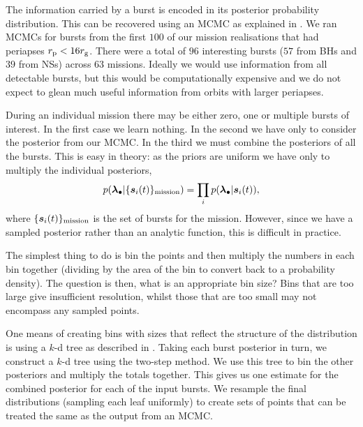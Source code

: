 The information carried by a burst is encoded in its posterior probability distribution. This can be recovered using an MCMC as explained in . We ran MCMCs for bursts from the first $100$ of our mission realisations that had periapses $r_\mathrm{p} < 16 r_\mathrm{g}$. There were a total of $96$ interesting bursts ($57$ from BHs and $39$ from NSs) across $63$ missions. %
Ideally we would use information from all detectable bursts, but this would be computationally expensive and we do not expect to glean much useful information from orbits with larger periapses.

During an individual mission there may be either zero, one or multiple bursts of interest. In the first case we learn nothing. In the second we have only to consider the posterior from our MCMC. In the third we must combine the posteriors of all the bursts. This is easy in theory: as the priors are uniform we have only to multiply the individual posteriors,
\begin{equation}
p(\boldsymbol{\lambda}_\bullet|\{\boldsymbol{s}_i(t)\}_\mathrm{mission}) = \prod_i p(\boldsymbol{\lambda}_\bullet|\boldsymbol{s}_i(t)),
\end{equation}
where $\{\boldsymbol{s}_i(t)\}_\mathrm{mission}$ is the set of bursts for the mission. However, since we have a sampled posterior rather than an analytic function, this is difficult in practice.

The simplest thing to do is bin the points and then multiply the numbers in each bin together (dividing by the area of the bin to convert back to a probability density). The question is then, what is an appropriate bin size? Bins that are too large give insufficient resolution, whilst those that are too small may not encompass any sampled points.

One means of creating bins with sizes that reflect the structure of the distribution is using a $k$-d tree as described in . Taking each burst posterior in turn, we construct a $k$-d tree using the two-step method. We use this tree to bin the other posteriors and multiply the totals together. This gives us one estimate for the combined posterior for each of the input bursts. We resample the final distributions (sampling each leaf uniformly) to create sets of points that can be treated the same as the output from an MCMC.

